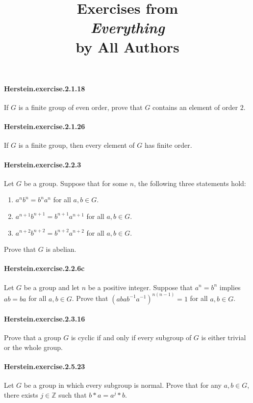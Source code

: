 \documentclass{article}
\title{\textbf{
Exercises from \\
\textit{Everything} \\
by All Authors
}}
\date{}
\begin{document}
\maketitle

\paragraph{Herstein.exercise.2.1.18} If $G$ is a finite group of even order, prove that $G$ contains an element of order $2$.

\paragraph{Herstein.exercise.2.1.26} If $G$ is a finite group, then every element of $G$ has finite order.

\paragraph{Herstein.exercise.2.2.3} Let $G$ be a group. Suppose that for some $n$, the following three statements hold:
\begin{enumerate}
\item $a^n b^n = b^n a^n$ for all $a, b \in G$.
\item $a^{n+1} b^{n+1} = b^{n+1} a^{n+1}$ for all $a, b \in G$.
\item $a^{n+2} b^{n+2} = b^{n+2} a^{n+2}$ for all $a, b \in G$.
\end{enumerate}
Prove that $G$ is abelian.

\paragraph{Herstein.exercise.2.2.6c} Let $G$ be a group and let $n$ be a positive integer. Suppose that $a^n=b^n$ implies $ab=ba$ for all $a, b \in G$. Prove that $(abab^{-1}a^{-1})^{n(n-1)}=1$ for all $a, b \in G$.

\paragraph{Herstein.exercise.2.3.16} Prove that a group $G$ is cyclic if and only if every subgroup of $G$ is either trivial or the whole group.

\paragraph{Herstein.exercise.2.5.23} Let $G$ be a group in which every subgroup is normal. Prove that for any $a, b \in G$, there exists $j \in \mathbb{Z}$ such that $b*a = a^j*b$.
\end{document}
